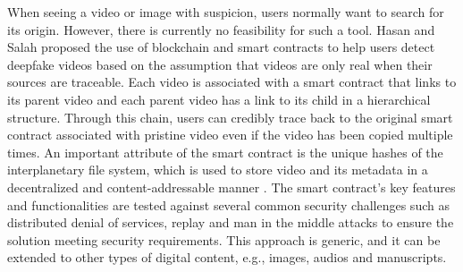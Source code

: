When seeing a video or image with suspicion, users normally want to search for its origin. However, there is currently no feasibility for such a tool. Hasan and Salah  proposed the use of blockchain and smart contracts to help users detect deepfake videos based on the assumption that videos are only real when their sources are traceable. Each video is associated with a smart contract that links to its parent video and each parent video has a link to its child in a hierarchical structure. Through this chain, users can credibly trace back to the original smart contract associated with pristine video even if the video has been copied multiple times. An important attribute of the smart contract is the unique hashes of the interplanetary file system, which is used to store video and its metadata in a decentralized and content-addressable manner . The smart contract's key features and functionalities are tested against several common security challenges such as distributed denial of services, replay and man in the middle attacks to ensure the solution meeting security requirements. This approach is generic, and it can be extended to other types of digital content, e.g., images, audios and manuscripts.
